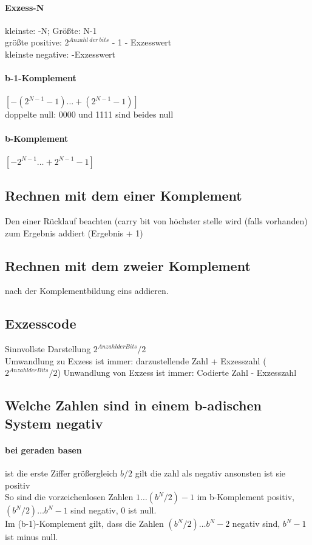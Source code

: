 \documentclass[a4paper]{article}
\begin{document}
		\paragraph{Exzess-N}
		kleinste: -N; Größte: N-1\\
		größte positive: $2^{Anzahl~der~bits}$ - 1 - Exzesswert\\
		kleinste negative: -Exzesswert
		\paragraph{b-1-Komplement}
		$[ -(2^{N-1}-1) … +(2^{N-1}-1)]$\\
		doppelte null: 0000 und 1111 sind beides null
		\paragraph{b-Komplement}
		$[ - 2^{N-1} … +2^{N-1} - 1]$
		
	\subsection{Rechnen mit dem einer Komplement}
		Den einer Rücklauf beachten (carry bit von höchster stelle wird (falls vorhanden) zum Ergebnis addiert (Ergebnis + 1)
	\subsection{Rechnen mit dem zweier Komplement}
		nach der Komplementbildung eins addieren.
	\subsection{Exzesscode}
		Sinnvollste Darstellung $2^{Anzahl der Bits} / 2$\\
		Umwandlung zu Exzess ist immer: darzustellende Zahl + Exzesszahl ($2^{Anzahl der Bits} / 2$)
		Unwandlung von Exzess ist immer: Codierte Zahl - Exzesszahl
		
	\subsection{Welche Zahlen sind in einem b-adischen System negativ}
		\paragraph{bei geraden basen} ist die erste Ziffer größergleich $ b / 2 $ gilt die zahl als negativ ansonsten ist sie positiv \\
		So sind die vorzeichenlosen Zahlen $1 … (b^N/2)-1$ im b-Komplement positiv, $(b^N/2) … b^N-1$ sind negativ, $0$ ist null.\\
		Im (b-1)-Komplement gilt, dass die Zahlen $(b^N/2) … b^N-2$ negativ sind, $b^N-1$ ist minus null.
\end{document}
